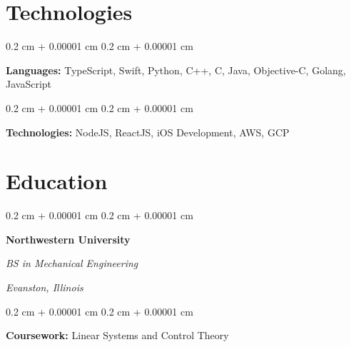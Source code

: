 \documentclass[12pt, letterpaper]{article}
\newenvironment{highlights}{
    \begin{itemize}[
        topsep=0.10 cm,
        parsep=0.10 cm,
        partopsep=0pt,
        itemsep=0pt,
        leftmargin=0.4 cm + 10pt
    ]
}{
    \end{itemize}
} %
\newenvironment{onecolentry}{
    \begin{adjustwidth}{
        0.2 cm + 0.00001 cm
    }{
        0.2 cm + 0.00001 cm
    }
}{
    \end{adjustwidth}
} %
\newenvironment{twocolentry}[2][]{
    \onecolentry
    \def\secondColumn{#2}
    \setcolumnwidth{\fill, 4.5 cm}
    \begin{paracol}{2}
}{
    \switchcolumn \raggedleft \secondColumn
    \end{paracol}
    \endonecolentry
} %
\begin{document}
    \section{Technologies}
        \begin{onecolentry}
            \textbf{Languages:} TypeScript, Swift, Python, C++, C, Java, Objective-C, Golang, JavaScript
        \end{onecolentry}

        \vspace{0.2 cm}

        \begin{onecolentry}
            \textbf{Technologies:} NodeJS, ReactJS, iOS Development, AWS, GCP
        \end{onecolentry}

    \section{Education}
        \begin{twocolentry}{
        \textit{Evanston, Illinois}}
            \textbf{Northwestern University}

            \textit{BS in Mechanical Engineering}
        \end{twocolentry}

        \vspace{0.10 cm}
        \begin{onecolentry}
                \textbf{Coursework:} Linear Systems and Control Theory
        \end{onecolentry}
    
    
\end{document}
